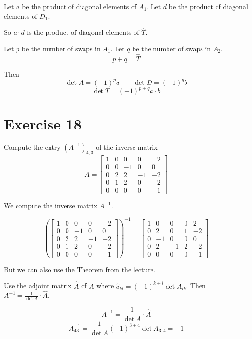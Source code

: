 \documentclass[a4paper]{article}
\theoremstyle{definition}
\begin{document}
Let $a$ be the product of diagonal elements of $A_1$.
Let $d$ be the product of diagonal elements of $D_1$.

So $a \cdot d$ is the product of diagonal elements of $\hat T$.

Let $p$ be the number of swaps in $A_1$. Let $q$ be the number of swaps in $A_2$.
\[ p + q = \hat{T} \]

Then
\[ \det{A} = (-1)^p a \qquad \det{D} = (-1)^q b \]
\[ \det{T} = (-1)^{p+q} a \cdot b \]

\section{Exercise 18}
\begin{ex}
  Compute the entry $(A^{-1})_{4,3}$ of the inverse matrix
  \[
    A = \begin{bmatrix}
      1 & 0 & 0 & 0 & -2 \\
      0 & 0 & -1 & 0 & 0 \\
      0 & 2 & 2 & -1 & -2 \\
      0 & 1 & 2 & 0 & -2 \\
      0 & 0 & 0 & 0 & -1
    \end{bmatrix}
  \]
\end{ex}

We compute the inverse matrix $A^{-1}$.

\[
  \left(\begin{bmatrix}
    1 & 0 & 0 & 0 & -2 \\
    0 & 0 & -1 & 0 & 0 \\
    0 & 2 & 2 & -1 & -2 \\
    0 & 1 & 2 & 0 & -2 \\
    0 & 0 & 0 & 0 & -1
  \end{bmatrix}\right)^{-1}
  =
  \begin{bmatrix}
    1 & 0 & 0 & 0 & 2 \\
    0 & 2 & 0 & 1 & -2 \\
    0 & -1 & 0 & 0 & 0 \\
    0 & 2 & -1 & 2 & -2 \\
    0 & 0 & 0 & 0 & -1
  \end{bmatrix}
\]

But we can also use the Theorem from the lecture.

Use the adjoint matrix $\hat{A}$ of $A$ where $\hat{a}_{kl} = (-1)^{k+l} \det{A_{lk}}$.
Then $A^{-1} = \frac{1}{\det{A}} \cdot \hat{A}$.

\[ A^{-1} = \frac{1}{\det{A}} \cdot \hat{A} \]
\[ A^{-1}_{43} = \frac{1}{\det{A}} (-1)^{3+4} \det{A_{3,4}} = -1 \]
\end{document}
